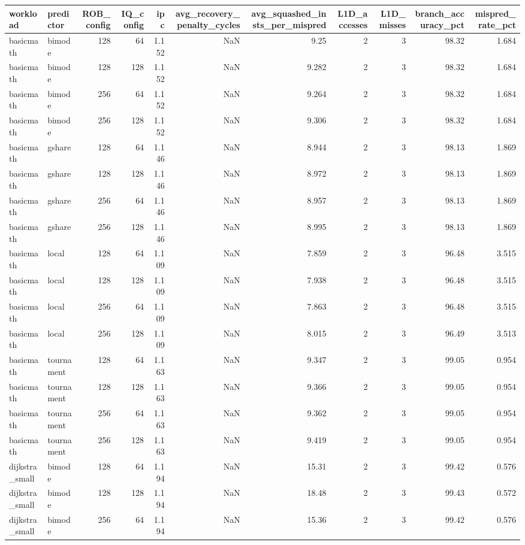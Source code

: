 \begin{tabular}{llrrrrrrrrr}
\toprule
workload & predictor & ROB_config & IQ_config & ipc & avg_recovery_penalty_cycles & avg_squashed_insts_per_mispred & L1D_accesses & L1D_misses & branch_accuracy_pct & mispred_rate_pct \\
\midrule
basicmath & bimode & 128 & 64 & 1.152 & NaN & 9.25 & 2 & 3 & 98.32 & 1.684 \\
basicmath & bimode & 128 & 128 & 1.152 & NaN & 9.282 & 2 & 3 & 98.32 & 1.684 \\
basicmath & bimode & 256 & 64 & 1.152 & NaN & 9.264 & 2 & 3 & 98.32 & 1.684 \\
basicmath & bimode & 256 & 128 & 1.152 & NaN & 9.306 & 2 & 3 & 98.32 & 1.684 \\
basicmath & gshare & 128 & 64 & 1.146 & NaN & 8.944 & 2 & 3 & 98.13 & 1.869 \\
basicmath & gshare & 128 & 128 & 1.146 & NaN & 8.972 & 2 & 3 & 98.13 & 1.869 \\
basicmath & gshare & 256 & 64 & 1.146 & NaN & 8.957 & 2 & 3 & 98.13 & 1.869 \\
basicmath & gshare & 256 & 128 & 1.146 & NaN & 8.995 & 2 & 3 & 98.13 & 1.869 \\
basicmath & local & 128 & 64 & 1.109 & NaN & 7.859 & 2 & 3 & 96.48 & 3.515 \\
basicmath & local & 128 & 128 & 1.109 & NaN & 7.938 & 2 & 3 & 96.48 & 3.515 \\
basicmath & local & 256 & 64 & 1.109 & NaN & 7.863 & 2 & 3 & 96.48 & 3.515 \\
basicmath & local & 256 & 128 & 1.109 & NaN & 8.015 & 2 & 3 & 96.49 & 3.513 \\
basicmath & tournament & 128 & 64 & 1.163 & NaN & 9.347 & 2 & 3 & 99.05 & 0.954 \\
basicmath & tournament & 128 & 128 & 1.163 & NaN & 9.366 & 2 & 3 & 99.05 & 0.954 \\
basicmath & tournament & 256 & 64 & 1.163 & NaN & 9.362 & 2 & 3 & 99.05 & 0.954 \\
basicmath & tournament & 256 & 128 & 1.163 & NaN & 9.419 & 2 & 3 & 99.05 & 0.954 \\
dijkstra_small & bimode & 128 & 64 & 1.194 & NaN & 15.31 & 2 & 3 & 99.42 & 0.576 \\
dijkstra_small & bimode & 128 & 128 & 1.194 & NaN & 18.48 & 2 & 3 & 99.43 & 0.572 \\
dijkstra_small & bimode & 256 & 64 & 1.194 & NaN & 15.36 & 2 & 3 & 99.42 & 0.576 \\

\end{tabular}
